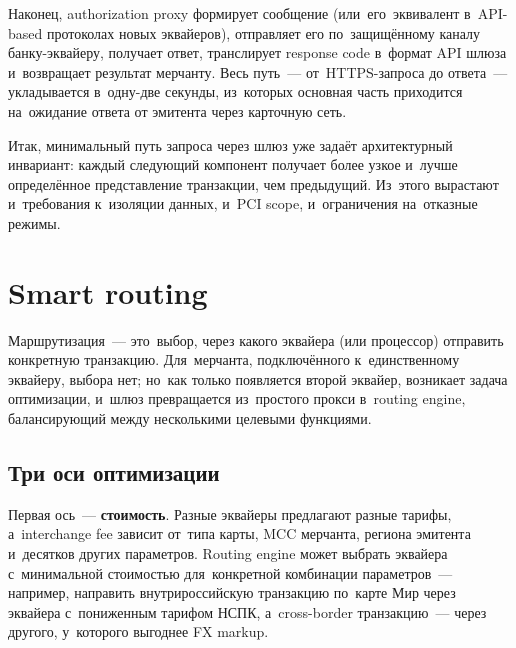 Наконец, authorization proxy формирует сообщение 
(или~его~эквивалент в~API-based протоколах новых эквайеров),
отправляет его по~защищённому каналу банку-эквайеру, получает ответ,
транслирует response code в~формат API шлюза и~возвращает результат
мерчанту. Весь путь~--- от~HTTPS-запроса до ответа~--- укладывается
в~одну-две секунды, из~которых основная часть приходится
на~ожидание ответа от эмитента через карточную сеть.


Итак, минимальный путь запроса через шлюз уже задаёт архитектурный
инвариант: каждый следующий компонент получает более узкое и~лучше
определённое представление транзакции, чем предыдущий. Из~этого
вырастают и~требования к~изоляции данных, и~PCI scope, и~ограничения
на~отказные режимы.


\section{Smart routing}
\label{sec:gw-routing}

Маршрутизация~--- это~выбор, через какого эквайера (или процессор)
отправить конкретную транзакцию. Для~мерчанта, подключённого
к~единственному эквайеру, выбора нет; но~как только появляется
второй эквайер, возникает задача оптимизации, и~шлюз превращается
из~простого прокси в~routing engine, балансирующий между несколькими
целевыми функциями.

\subsection*{Три оси оптимизации}

Первая ось~--- \textbf{стоимость}. Разные эквайеры предлагают
разные тарифы, а~interchange fee зависит от~типа карты, MCC мерчанта,
региона эмитента и~десятков других параметров. Routing engine может
выбрать эквайера с~минимальной стоимостью для~конкретной комбинации
параметров~--- например, направить внутрироссийскую транзакцию
по~карте Мир через эквайера с~пониженным тарифом НСПК, а~cross-border
транзакцию~--- через другого, у~которого выгоднее FX markup.

